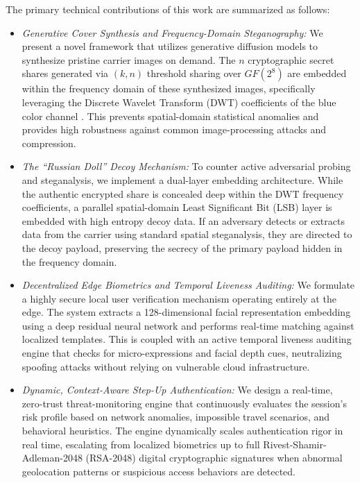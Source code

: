 \documentclass[conference]{IEEEtran}
\begin{document}
The primary technical contributions of this work are summarized as follows:
\begin{itemize}
\item \textit{Generative Cover Synthesis and Frequency-Domain Steganography:} We present a novel framework that utilizes generative diffusion models to synthesize pristine carrier images on demand. The $n$ cryptographic secret shares generated via $(k,n)$ threshold sharing over $GF(2^8)$ are embedded within the frequency domain of these synthesized images, specifically leveraging the Discrete Wavelet Transform (DWT) coefficients of the blue color channel \cite{dwtSteg}. This prevents spatial-domain statistical anomalies and provides high robustness against common image-processing attacks and compression.
\item \textit{The ``Russian Doll'' Decoy Mechanism:} To counter active adversarial probing and steganalysis, we implement a dual-layer embedding architecture. While the authentic encrypted share is concealed deep within the DWT frequency coefficients, a parallel spatial-domain Least Significant Bit (LSB) layer is embedded with high entropy decoy data. If an adversary detects or extracts data from the carrier using standard spatial steganalysis, they are directed to the decoy payload, preserving the secrecy of the primary payload hidden in the frequency domain.
\item \textit{Decentralized Edge Biometrics and Temporal Liveness Auditing:} We formulate a highly secure local user verification mechanism operating entirely at the edge. The system extracts a 128-dimensional facial representation embedding using a deep residual neural network and performs real-time matching against localized templates. This is coupled with an active temporal liveness auditing engine that checks for micro-expressions and facial depth cues, neutralizing spoofing attacks without relying on vulnerable cloud infrastructure.
\item \textit{Dynamic, Context-Aware Step-Up Authentication:} We design a real-time, zero-trust threat-monitoring engine that continuously evaluates the session's risk profile based on network anomalies, impossible travel scenarios, and behavioral heuristics. The engine dynamically scales authentication rigor in real time, escalating from localized biometrics up to full Rivest-Shamir-Adleman-2048 (RSA-2048) digital cryptographic signatures when abnormal geolocation patterns or suspicious access behaviors are detected.
\end{itemize}
\end{document}
